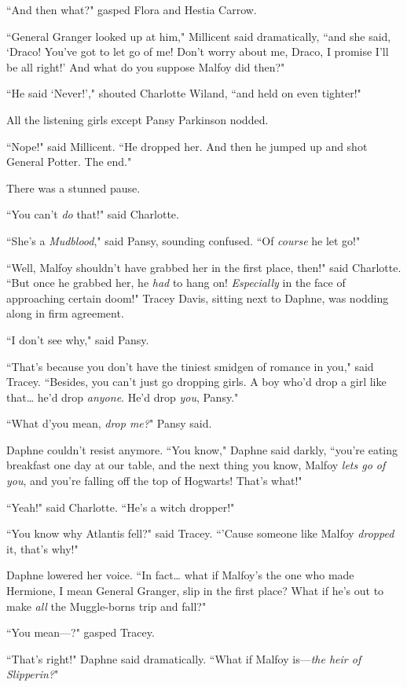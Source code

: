 ``And then what?" gasped Flora and Hestia Carrow.

``General Granger looked up at him," Millicent said dramatically, ``and she said, `Draco! You've got to let go of me! Don't worry about me, Draco, I promise I'll be all right!' And what do you suppose Malfoy did then?"

``He said `Never!'," shouted Charlotte Wiland, ``and held on even tighter!"

All the listening girls except Pansy Parkinson nodded.

``Nope!" said Millicent. ``He dropped her. And then he jumped up and shot General Potter. The end."

There was a stunned pause.

``You can't \emph{do} that!" said Charlotte.

``She's a \emph{Mudblood}," said Pansy, sounding confused. ``Of \emph{course} he let go!"

``Well, Malfoy shouldn't have grabbed her in the first place, then!" said Charlotte. ``But once he grabbed her, he \emph{had} to hang on! \emph{Especially} in the face of approaching certain doom!" Tracey Davis, sitting next to Daphne, was nodding along in firm agreement.

``I don't see why," said Pansy.

``That's because you don't have the tiniest smidgen of romance in you," said Tracey. ``Besides, you can't just go dropping girls. A boy who'd drop a girl like that{\ldots} he'd drop \emph{anyone}. He'd drop \emph{you}, Pansy."

``What d'you mean, \emph{drop me?}" Pansy said.

Daphne couldn't resist anymore. ``You know," Daphne said darkly, ``you're eating breakfast one day at our table, and the next thing you know, Malfoy \emph{lets go of you}, and you're falling off the top of Hogwarts! That's what!"

``Yeah!" said Charlotte. ``He's a witch dropper!"

``You know why Atlantis fell?" said Tracey. ``'Cause someone like Malfoy \emph{dropped} it, that's why!"

Daphne lowered her voice. ``In fact{\ldots} what if Malfoy's the one who made Hermione, I mean General Granger, slip in the first place? What if he's out to make \emph{all} the Muggle-borns trip and fall?"

``You mean---?" gasped Tracey.

``That's right!" Daphne said dramatically. ``What if Malfoy is---\emph{the heir of Slipperin?}"

